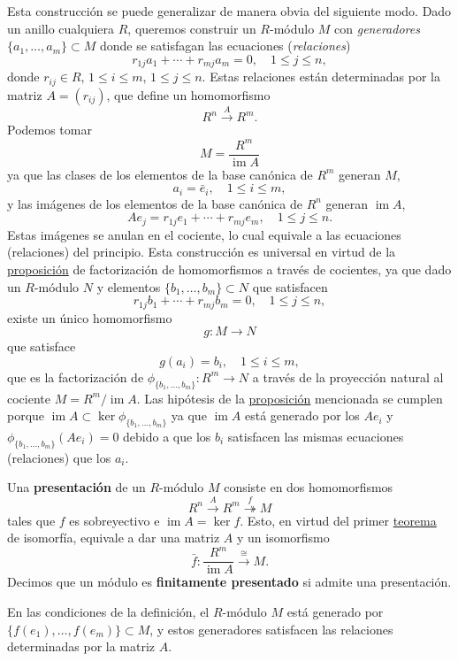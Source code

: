 Esta construcción se puede generalizar de manera obvia del siguiente
modo. Dado un anillo cualquiera \(R\), queremos construir un
\(R\)-módulo \(M\) con \emph{generadores}
\(\{a_1,\dots,a_m\}\subset M\) donde se satisfagan las ecuaciones
(\emph{relaciones})
\[r_{1j}a_1+\cdots+r_{mj}a_m=0,\quad 1\leq j\leq n,\] donde
\(r_{ij}\in R\), \(1\leq i\leq m\), \(1\leq j\leq n\). Estas relaciones
están determinadas por la matriz \(A=(r_{ij})\), que define un
homomorfismo \[R^n\stackrel{A}\longrightarrow R^m.\] Podemos tomar
\[M=\frac{R^m}{\operatorname{im}A}\] ya que las clases de los elementos
de la base canónica de \(R^m\) generan \(M\),
\[a_i=\bar{e}_i,\quad 1\leq i\leq m,\] y las imágenes de los elementos
de la base canónica de \(R^n\) generan \(\operatorname{im}A\),
\[Ae_j=r_{1j}e_1+\cdots+r_{mj}e_m,\quad 1\leq j\leq n.\] Estas
imágenes se anulan en el cociente, lo cual equivale a las ecuaciones
(relaciones) del principio. Esta construcción es universal en virtud de
la \protect\hyperlink{factorquotientmodules}{proposición} de
factorización de homomorfismos a través de cocientes, ya que dado un
\(R\)-módulo \(N\) y elementos \(\{b_1,\dots,b_m\}\subset N\) que
satisfacen \[r_{1j}b_1+\cdots+r_{mj}b_m=0,\quad 1\leq j\leq n,\]
existe un único homomorfismo \[g\colon M\longrightarrow N\] que
satisface \[g(a_i)=b_i,\quad 1\leq i\leq m,\] que es la factorización
de \(\phi_{\{b_1,\dots,b_m\}}\colon R^m\rightarrow N\) a través de
la proyección natural al cociente \(M=R^m/\operatorname{im}A\). Las
hipótesis de la \protect\hyperlink{factorquotientmodules}{proposición}
mencionada se cumplen porque
\(\operatorname{im}A\subset \ker \phi_{\{b_1,\dots,b_m\}}\) ya que
\(\operatorname{im}A\) está generado por los \(Ae_i\) y
\(\phi_{\{b_1,\dots,b_m\}}(Ae_i)=0\) debido a que los \(b_i\)
satisfacen las mismas ecuaciones (relaciones) que los \(a_i\).


Una \textbf{presentación} de un \(R\)-módulo \(M\) consiste en dos
homomorfismos
\[R^n\stackrel{A}\longrightarrow R^m\stackrel{f}\twoheadrightarrow M\]
tales que \(f\) es sobreyectivo e \(\operatorname{im} A=\ker f\). Esto,
en virtud del primer \protect\hyperlink{isomodules}{teorema} de
isomorfía, equivale a dar una matriz \(A\) y un isomorfismo
\[\bar{f}\colon \frac{R^m}{\operatorname{im} A}\stackrel{\cong}\longrightarrow M.\]
Decimos que un módulo es \textbf{finitamente presentado} si admite una
presentación. 


En las condiciones de la definición, el \(R\)-módulo \(M\) está generado
por \(\{f(e_1),\dots,f(e_m)\}\subset M\), y estos generadores
satisfacen las relaciones determinadas por la matriz \(A\). 


